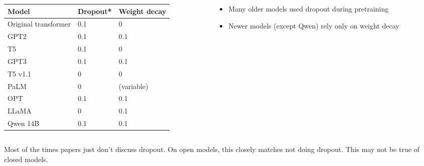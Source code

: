 \begin{columns}[T]
\begin{column}{0.58\textwidth}
\footnotesize
\renewcommand{\arraystretch}{0.95}
\begin{tabular}{@{}lll@{}}
\toprule
\textbf{Model} & \textbf{Dropout*} & \textbf{Weight decay}\\
\midrule
Original transformer & 0.1 & 0\\
GPT2 & 0.1 & 0.1\\
T5 & 0.1 & 0\\
GPT3 & 0.1 & 0.1\\
T5 v1.1 & 0 & 0\\
PaLM & 0 & (variable)\\
OPT & 0.1 & 0.1\\
LLaMA & 0 & 0.1\\
Qwen 14B & 0.1 & 0.1\\
\bottomrule
\end{tabular}
\end{column}
\begin{column}{0.4\textwidth}
\vspace{2.5em}
\begin{itemize}
  \item Many older models used dropout during pretraining
  \item Newer models (except Qwen) rely only on weight decay
\end{itemize}
\end{column}
\end{columns}
\vfill
{\scriptsize * Most of the times papers just don't discuss dropout. On open models, this closely matches not doing dropout. This may not be true of closed models.\par}
